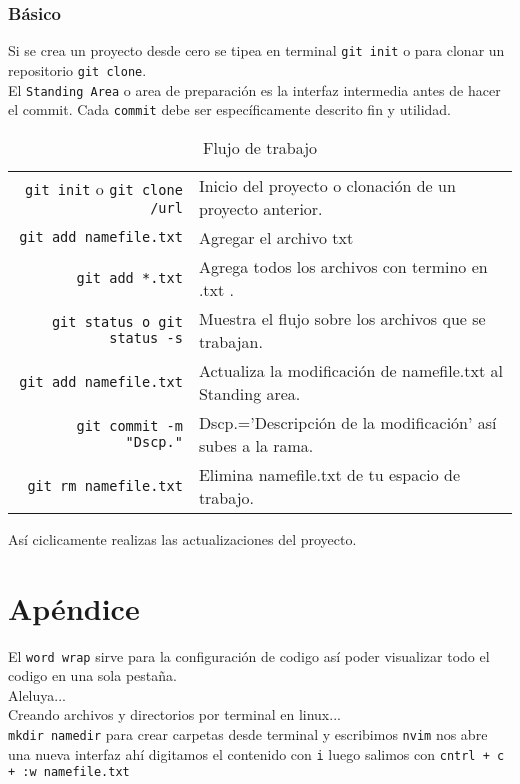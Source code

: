 \documentclass{article}
\theoremstyle{mytheoremstyle}
\theoremstyle{mytheoremstyle}
\theoremstyle{myproblemstyle}
\begin{document}
    \subsubsection{Básico}
    Si se crea un proyecto desde cero se tipea en terminal \texttt{git init} o para clonar un repositorio \texttt{git clone}.
    \\ 
    El \texttt{Standing Area} o area de preparación es la interfaz intermedia antes de hacer el commit. 
    Cada \texttt{commit} debe ser específicamente descrito fin y utilidad.\\
    \begin{table}[h!]
        \centering
        \begin{tabular}{r|l}            
            \texttt{git init} o \texttt{git clone /url} & Inicio del proyecto o clonación de un proyecto anterior.\\
            \texttt{git add namefile.txt}& Agregar el archivo txt\\ 
            \texttt{git add *.txt} & Agrega todos los archivos con termino en .txt .\\
            \texttt{git status o git status -s}& Muestra el flujo sobre los archivos que se trabajan.\\ 
            \texttt{git add namefile.txt} &  Actualiza la  modificación de namefile.txt al Standing area.\\
            \texttt{git commit -m "Dscp."}&  Dscp.='Descripción de la modificación' así subes a  la rama.\\ 
            \texttt{git rm namefile.txt} & Elimina namefile.txt de tu espacio de trabajo.
        \end{tabular}
        \caption{Flujo de trabajo}
    \end{table}   
    Así ciclicamente realizas las actualizaciones del proyecto. 
\section{Apéndice}
El \texttt{word wrap} sirve para la configuración de codigo así poder visualizar todo el codigo en una sola pestaña. \\ 
Aleluya...\\
    Creando archivos y directorios por terminal en linux... \\
\texttt{mkdir namedir} para crear carpetas desde terminal y escribimos \texttt{nvim} nos abre una nueva interfaz ahí digitamos el contenido  con  \texttt{i} luego salimos con \texttt{cntrl + c + :w namefile.txt}  
\end{document}
